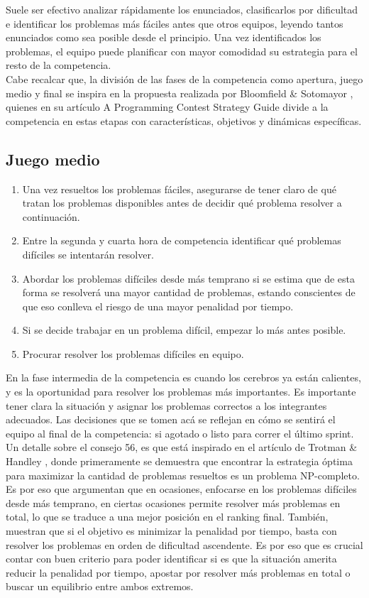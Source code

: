 Suele ser efectivo analizar rápidamente los enunciados, clasificarlos por dificultad e identificar los problemas más fáciles antes que otros equipos, leyendo tantos enunciados como sea posible desde el principio. Una vez identificados los problemas, el equipo puede planificar con mayor comodidad su estrategia para el resto de la competencia.\\

Cabe recalcar que, la división de las fases de la competencia como apertura, juego medio y final se inspira en la propuesta realizada por Bloomfield \& Sotomayor \cite{bloomfield2016}, quienes en su artículo A Programming Contest Strategy Guide divide a la competencia en estas etapas con características, objetivos y dinámicas específicas.
\pagebreak
\subsection{Juego medio}
\begin{enumerate}[resume=icpc]
    \item Una vez resueltos los problemas fáciles, asegurarse de tener claro de qué tratan los problemas disponibles antes de decidir qué problema resolver a continuación.
    \item Entre la segunda y cuarta hora de competencia identificar qué problemas difíciles se intentarán resolver.
    \item Abordar los problemas difíciles desde más temprano si se estima que de esta forma se resolverá una mayor cantidad de problemas, estando conscientes de que eso conlleva el riesgo de una mayor penalidad por tiempo.
    \item Si se decide trabajar en un problema difícil, empezar lo más antes posible.
    \item Procurar resolver los problemas difíciles en equipo.
\end{enumerate}
En la fase intermedia de la competencia es cuando los cerebros ya están calientes, y es la oportunidad para resolver los problemas más importantes. Es importante tener clara la situación y asignar los problemas correctos a los integrantes adecuados. Las decisiones que se tomen acá se reflejan en cómo se sentirá el equipo al final de la competencia: si agotado o listo para correr el último sprint.\\

Un detalle sobre el consejo 56, es que está inspirado en el artículo de Trotman \& Handley \cite{trotman2008}, donde primeramente se demuestra que encontrar la estrategia óptima para maximizar la cantidad de problemas resueltos es un problema NP-completo. Es por eso que argumentan que en ocasiones, enfocarse en los problemas difíciles desde más temprano, en ciertas ocasiones permite resolver más problemas en total, lo que se traduce a una mejor posición en el ranking final. También, muestran que si el objetivo es minimizar la penalidad por tiempo, basta con resolver los problemas en orden de dificultad ascendente. Es por eso que es crucial contar con buen criterio para poder identificar si es que la situación amerita reducir la penalidad por tiempo, apostar por resolver más problemas en total o buscar un equilibrio entre ambos extremos.
\pagebreak
